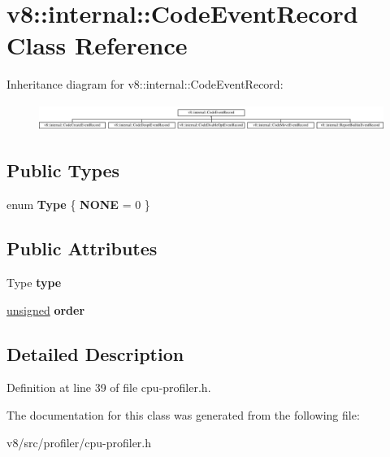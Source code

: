 \hypertarget{classv8_1_1internal_1_1CodeEventRecord}{}\section{v8\+:\+:internal\+:\+:Code\+Event\+Record Class Reference}
\label{classv8_1_1internal_1_1CodeEventRecord}
Inheritance diagram for v8\+:\+:internal\+:\+:Code\+Event\+Record\+:\begin{figure}[H]
\begin{center}
\leavevmode
\includegraphics[height=0.885375cm]{classv8_1_1internal_1_1CodeEventRecord}
\end{center}
\end{figure}
\subsection*{Public Types}
\begin{DoxyCompactItemize}
\item 
\mbox{\label{classv8_1_1internal_1_1CodeEventRecord_ad95141a659db53d824d82e91f357d7bc}} 
enum {\bfseries Type} \{ {\bfseries N\+O\+NE} = 0
 \}
\end{DoxyCompactItemize}
\subsection*{Public Attributes}
\begin{DoxyCompactItemize}
\item 
\mbox{\label{classv8_1_1internal_1_1CodeEventRecord_a2ef08c576ec1178cdf525e1823b24762}} 
Type {\bfseries type}
\item 
\mbox{\label{classv8_1_1internal_1_1CodeEventRecord_aeee2145d3bfcdb0120d2a915839548a0}} 
\mbox{\hyperlink{classunsigned}{unsigned}} {\bfseries order}
\end{DoxyCompactItemize}


\subsection{Detailed Description}


Definition at line 39 of file cpu-\/profiler.\+h.



The documentation for this class was generated from the following file\+:\begin{DoxyCompactItemize}
\item 
v8/src/profiler/cpu-\/profiler.\+h\end{DoxyCompactItemize}
